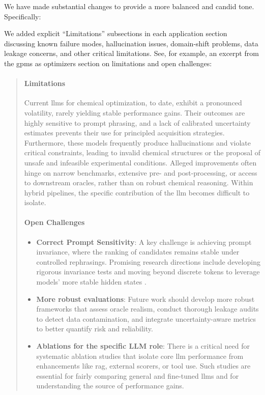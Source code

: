 \begin{reply}
We have made substantial changes to provide a more balanced and candid tone. Specifically:

We added explicit ``Limitations'' subsections in each application section discussing known failure modes, hallucination issues, domain-shift problems, data leakage concerns, and other critical limitations.
See, for example, an excerpt from the \glspl{gpm} as optimizers section on limitations and open challenges:

\begin{quote}
    
\paragraph{Limitations}
Current \glspl{llm} for chemical optimization, to date, exhibit a pronounced volatility, rarely yielding stable performance gains. 
Their outcomes are highly sensitive to prompt phrasing, and a lack of calibrated uncertainty estimates prevents their use for principled acquisition strategies. \autocite{liu2024large}
Furthermore, these models frequently produce hallucinations and violate critical constraints, leading to invalid chemical structures or the proposal of unsafe and infeasible experimental conditions. 
Alleged improvements often hinge on narrow benchmarks, extensive pre- and post-processing, or access to downstream oracles, rather than on robust chemical reasoning. 
Within hybrid pipelines, the specific contribution of the \gls{llm} becomes difficult to isolate.

\paragraph{Open Challenges}
\begin{itemize}
    \item \textbf{Correct Prompt Sensitivity}: A key challenge is achieving prompt invariance, where the ranking of candidates remains stable under controlled rephrasings. Promising research directions include developing rigorous invariance tests and moving beyond discrete tokens to leverage models' more stable hidden states \autocite{rankovic2025gollum0}.
    \item \textbf{More robust evaluations}: Future work should develop more robust frameworks that assess oracle realism, conduct thorough leakage audits to detect data contamination, and integrate uncertainty-aware metrics to better quantify risk and reliability.
    \item \textbf{Ablations for the specific LLM role}: There is a critical need for systematic ablation studies that isolate core \gls{llm} performance from enhancements like \gls{rag}, external scorers, or tool use. Such studies are essential for fairly comparing general and fine-tuned \glspl{llm} and for understanding the source of performance gains.
\end{itemize}
\end{quote}
\end{reply}

